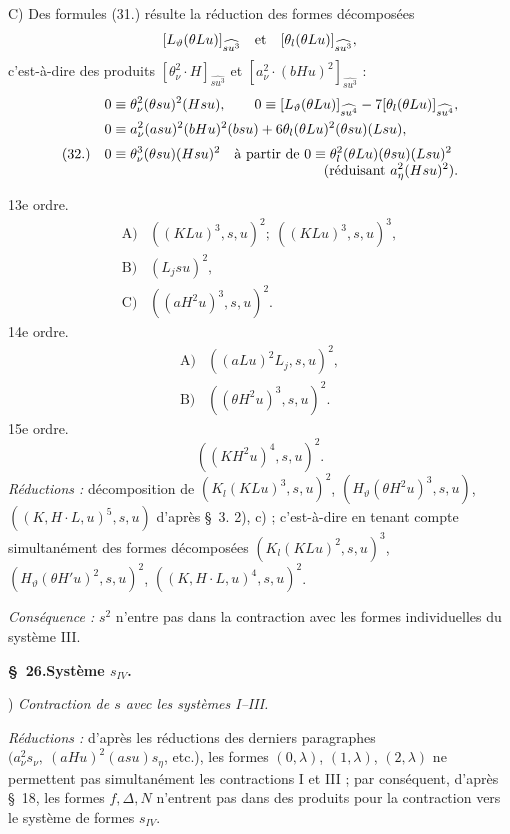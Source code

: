 \documentclass[11pt]{article}
\newcommand{\D}{\Delta}
\begin{document}
C) Des formules (31.) résulte la réduction des formes décomposées
\[
 [L_\vartheta(\theta Lu)]_{\widehat{su^3}}\quad\hbox{et}\quad [\theta_l(\theta Lu)]_{\widehat{su^3}},
\]
c'est-à-dire des produits $[\theta_\nu^2\cdot H]_{\widehat{su^3}}$ et $[a_\nu^2\cdot(bHu)^2]_{\widehat{su^3}}$ :
\[
\begin{array}{@{}r@{\quad}l@{}}
&\displaystyle 0\equiv\theta_\nu^2(\theta su)^2(Hsu),\qquad
0\equiv [L_\vartheta(\theta Lu)]_{\widehat{su^4}}-7[\theta_l(\theta Lu)]_{\widehat{su^4}},\\[0.55em]
&\displaystyle 0\equiv a_\nu^2(asu)^2(bHu)^2(bsu)+6\theta_l(\theta Lu)^2(\theta su)(Lsu),\\[0.55em]
(32.)&\displaystyle 0\equiv\theta_\nu^3(\theta su)(Hsu)^2
\quad\hbox{à partir de }0\equiv\theta_l^2(\theta Lu)(\theta su)(Lsu)^2\\[-0.05em]
&\displaystyle\hfill(\hbox{réduisant }a_\eta^2(Hsu)^2).
\end{array}
\]

\noindent 13e ordre.
\[
\begin{array}{rl}
\text{A)}&((KLu)^3,s,u)^2;\ ((KLu)^3,s,u)^3,\\[0.25em]
\text{B)}&(L_jsu)^2,\\[0.25em]
\text{C)}&((aH^2u)^3,s,u)^2.
\end{array}
\]
\noindent 14e ordre.
\[
\begin{array}{rl}
\text{A)}&((aLu)^2L_j,s,u)^2,\\[0.25em]
\text{B)}&((\theta H^2u)^3,s,u)^2.
\end{array}
\]
\noindent 15e ordre.
\[
 ((KH^2u)^4,s,u)^2.
\]
\noindent\emph{Réductions :} décomposition de $(K_l(KLu)^3,s,u)^2$, $(H_\vartheta(\theta H^2u)^3,s,u)$, $((K,H\cdot L,u)^5,s,u)$ d'après \S\ 3. 2), c) ; c'est-à-dire en tenant compte simultanément des formes décomposées $(K_l(KLu)^2,s,u)^3$, $(H_\vartheta(\theta H'u)^2,s,u)^2$, $((K,H\cdot L,u)^4,s,u)^2$.

\noindent\emph{Conséquence :} $s^2$ n'entre pas dans la contraction avec les formes individuelles du système III.

\begin{center}\textbf{\S\ 26.\quad Système $s_{IV}$.}\end{center}
) \emph{Contraction de $s$ avec les systèmes I--III.}

\noindent\emph{Réductions :} d'après les réductions des derniers paragraphes $(a_\nu^2s_\nu,\ (aHu)^2(asu)s_\eta$, etc.), les formes $(0,\lambda)$, $(1,\lambda)$, $(2,\lambda)$ ne permettent pas simultanément les contractions I et III ; par conséquent, d'après \S\ 18, les formes $f,\D,N$ n'entrent pas dans des produits pour la contraction vers le système de formes $s_{IV}$.
\end{document}
